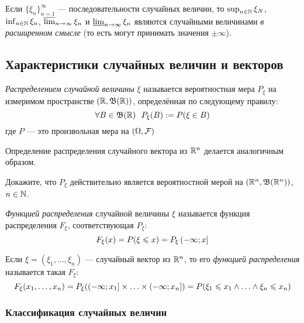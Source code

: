 \begin{proposition}
	Если $\{\xi_n\}_{n = 1}^\infty$ --- последовательности случайных величин, то $\sup_{n \in \mathbb{N}} \xi_N$, $\inf_{n \in \mathbb{N}} \xi_n$, $\varlimsup_{n \to \infty} \xi_n$ и $\varliminf_{n \to \infty} \xi_n$ являются случайными величинами \textit{в расширенном смысле} (то есть могут принимать значения $\pm\infty$).
\end{proposition}

\subsection{Характеристики случайных величин и векторов}

\begin{definition}
	\textit{Распределением случайной величины} $\xi$ называется вероятностная мера $P_\xi$ на измеримом пространстве $(\mathbb{R}, \mathfrak{B}(\mathbb{R}))$, определённая по следующему правилу:
	\[
		\forall B \in \mathfrak{B}(\mathbb{R})\ \  P_\xi(B) := P(\xi \in B)
	\]
	где $P$ --- это произвольная мера на $(\Omega, \mathcal{F})$
\end{definition}

\begin{note}
	Определение распределения случайного вектора из $\mathbb{R}^n$ делается аналогичным образом.
\end{note}

\begin{exercise}
	Докажите, что $P_\xi$ действительно является вероятностной мерой на $(\mathbb{R}^n, \mathfrak{B}(\mathbb{R}^n))$, $n \in \mathbb{N}$.
\end{exercise}

\begin{definition}
	\textit{Функцией распределения} случайной величины $\xi$ называется функция распределения $F_\xi$, соответствующая $P_\xi$:
	\[
		F_\xi(x) = P(\xi \leqslant x) = P_\xi\left(-\infty; x\right]
	\]
\end{definition}

\begin{definition}
	Если $\xi = (\xi_1, \ldots, \xi_n)$ --- случайный вектор из $\mathbb{R}^n$, то его \textit{функцией распределения} называется такая $F_\xi$:
	\[
		F_\xi(x_1, \ldots, x_n) = P_\xi(\left(-\infty; x_1\right] \times \ldots \times \left(-\infty; x_n\right]) = P(\xi_1 \leqslant x_1 \wedge \ldots \wedge \xi_n \leqslant x_n)
	\]
\end{definition}

\subsubsection*{Классификация случайных величин}

